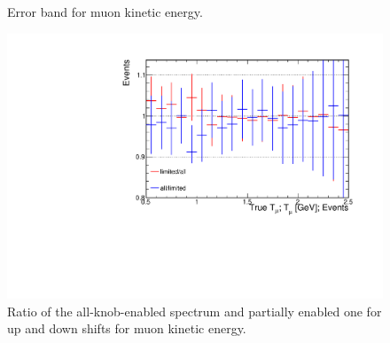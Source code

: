 \documentclass[12pt,a4paper,final]{iopart}
\begin{document}
\begin{figure}[h]
  \centering
  \hfill
  \caption{Error band for muon kinetic energy.}
\end{figure}
\begin{figure}[h]
  \centering
  \includegraphics[width=.9\textwidth]{figures/t_muke_ratio.pdf}
  \caption{Ratio of the all-knob-enabled spectrum and partially enabled one for up and down shifts for muon kinetic energy.}
  \label{fig:ratio_muke}
\end{figure}
\end{document}
